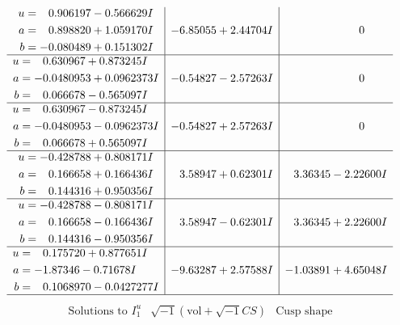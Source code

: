\documentclass[1p]{elsarticle_modified}
\theoremstyle{definition}
\newcommand{\I}{\sqrt{-1}}
\begin{document}
$$\begin{array}{c|c|c}
\begin{aligned}
u &= \phantom{-}0.906197 - 0.566629 I \\
a &= \phantom{-}0.898820 + 1.059170 I \\
b &= -0.080489 + 0.151302 I\end{aligned}
 & -6.85055 + 2.44704 I & \phantom{-0.000000 } 0 \\ \hline\begin{aligned}
u &= \phantom{-}0.630967 + 0.873245 I \\
a &= -0.0480953 + 0.0962373 I \\
b &= \phantom{-}0.066678 - 0.565097 I\end{aligned}
 & -0.54827 - 2.57263 I & \phantom{-0.000000 } 0 \\ \hline\begin{aligned}
u &= \phantom{-}0.630967 - 0.873245 I \\
a &= -0.0480953 - 0.0962373 I \\
b &= \phantom{-}0.066678 + 0.565097 I\end{aligned}
 & -0.54827 + 2.57263 I & \phantom{-0.000000 } 0 \\ \hline\begin{aligned}
u &= -0.428788 + 0.808171 I \\
a &= \phantom{-}0.166658 + 0.166436 I \\
b &= \phantom{-}0.144316 + 0.950356 I\end{aligned}
 & \phantom{-}3.58947 + 0.62301 I & \phantom{-}3.36345 - 2.22600 I \\ \hline\begin{aligned}
u &= -0.428788 - 0.808171 I \\
a &= \phantom{-}0.166658 - 0.166436 I \\
b &= \phantom{-}0.144316 - 0.950356 I\end{aligned}
 & \phantom{-}3.58947 - 0.62301 I & \phantom{-}3.36345 + 2.22600 I \\ \hline\begin{aligned}
u &= \phantom{-}0.175720 + 0.877651 I \\
a &= -1.87346 - 0.71678 I \\
b &= \phantom{-}0.1068970 - 0.0427277 I\end{aligned}
 & -9.63287 + 2.57588 I & -1.03891 + 4.65048 I\\
 \hline 
 \end{array}$$\newpage$$\begin{array}{c|c|c}  
\text{Solutions to }I^u_{1}& \I (\text{vol} + \sqrt{-1}CS) & \text{Cusp shape}\\

\end{array}$$
\end{document}
